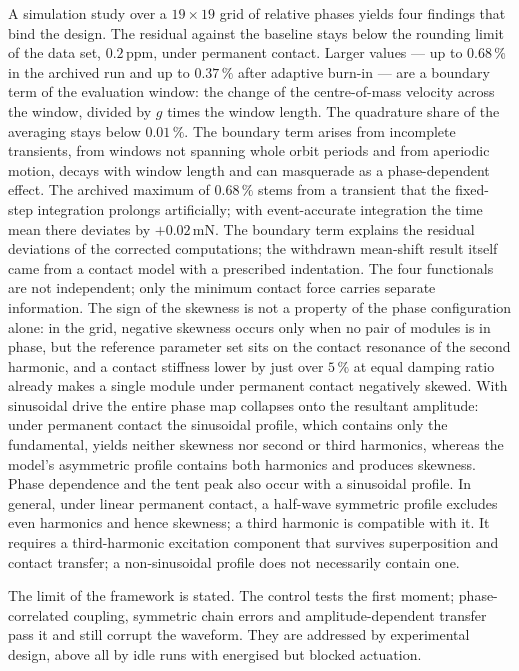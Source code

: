 \documentclass[12pt,a4paper]{report}
\begin{document}
A simulation study over a $19\times19$ grid of relative phases yields
four findings that bind the design. The residual against the baseline
stays below the rounding limit of the data set, $0{.}2\,\mathrm{ppm}$,
under permanent contact. Larger values --- up to
$0{.}68\,\%$ in the archived run and up to $0{.}37\,\%$ after adaptive
burn-in --- are a boundary term of the evaluation window: the change of
the centre-of-mass velocity across the window, divided by $g$ times the
window length. The quadrature share of the averaging stays below
$0{.}01\,\%$. The boundary term arises from incomplete transients, from
windows not spanning whole orbit periods and from aperiodic motion,
decays with window length and can masquerade as a phase-dependent
effect. The archived maximum of $0{.}68\,\%$ stems from a transient that
the fixed-step integration prolongs artificially; with event-accurate
integration the time mean there deviates by $+0{.}02\,\mathrm{mN}$. The
boundary term explains the residual deviations of the corrected
computations; the
withdrawn mean-shift result itself came from a contact model with a
prescribed indentation. The four functionals are not
independent; only the minimum contact force carries separate
information. The sign of the skewness is not a property of
the phase configuration alone: in the grid, negative skewness occurs only
when no pair of modules is in phase, but the reference parameter set sits
on the contact resonance of the second harmonic, and a contact stiffness
lower by just over $5\,\%$ at equal damping ratio already makes a single
module under permanent contact negatively skewed. With sinusoidal drive the
entire phase map collapses onto the resultant amplitude: under permanent
contact the sinusoidal profile, which contains only the fundamental,
yields neither skewness nor second or third harmonics, whereas the
model's asymmetric profile contains both harmonics and produces skewness.
Phase dependence and the tent peak also occur with a sinusoidal profile.
In general, under linear permanent contact, a half-wave symmetric profile
excludes even harmonics and hence skewness; a third harmonic is
compatible with it. It requires a third-harmonic excitation component
that survives superposition and contact transfer; a non-sinusoidal
profile does not necessarily contain one.

The limit of the framework is stated. The control tests the first
moment; phase-correlated coupling, symmetric chain errors and
amplitude-dependent transfer pass it and still corrupt the waveform.
They are addressed by experimental design, above all by idle runs with
energised but blocked actuation.
\end{document}
